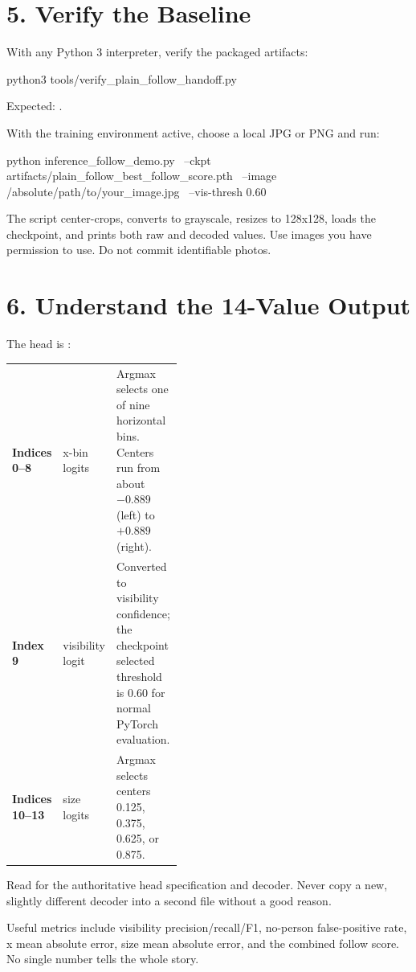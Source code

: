 \documentclass[11pt]{article}
\begin{document}
\section{5. Verify the Baseline}

With any Python 3 interpreter, verify the packaged artifacts:

\begin{Code}
python3 tools/verify_plain_follow_handoff.py
\end{Code}

Expected: .

With the training environment active, choose a local JPG or PNG and run:

\begin{Code}
python inference_follow_demo.py \
  --ckpt artifacts/plain_follow_best_follow_score.pth \
  --image /absolute/path/to/your_image.jpg \
  --vis-thresh 0.60
\end{Code}

The script center-crops, converts to grayscale, resizes to 128x128, loads the checkpoint, and prints both raw and decoded values. Use images you have permission to use. Do not commit identifiable photos.

\section{6. Understand the 14-Value Output}

The head is :

\begin{tabularx}{\linewidth}{>{\bfseries}p{0.20\linewidth}p{0.22\linewidth}X}
Indices 0--8 & x-bin logits & Argmax selects one of nine horizontal bins. Centers run from about $-0.889$ (left) to $+0.889$ (right). \\
Index 9 & visibility logit & Converted to visibility confidence; the checkpoint selected threshold is 0.60 for normal PyTorch evaluation. \\
Indices 10--13 & size logits & Argmax selects centers 0.125, 0.375, 0.625, or 0.875. \\
\end{tabularx}

Read \file{utils/follow\_task.py} for the authoritative head specification and decoder. Never copy a new, slightly different decoder into a second file without a good reason.

Useful metrics include visibility precision/recall/F1, no-person false-positive rate, x mean absolute error, size mean absolute error, and the combined follow score. No single number tells the whole story.
\end{document}
